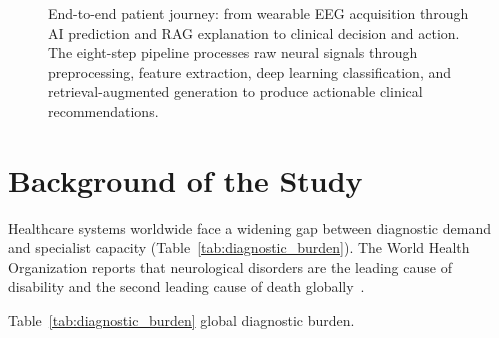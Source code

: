 \begin{figure}[!htbp]
{%
}
\caption[End-to-end patient journey]{End-to-end patient journey: from wearable EEG acquisition through AI prediction and RAG explanation to clinical decision and action. The eight-step pipeline processes raw neural signals through preprocessing, feature extraction, deep learning classification, and retrieval-augmented generation to produce actionable clinical recommendations.}
\label{fig:patient_journey}
\end{figure}

\section{Background of the Study}
\label{sec:background}

Healthcare systems worldwide face a widening gap between diagnostic demand and specialist capacity (Table~\ref{tab:diagnostic_burden}). The World Health Organization reports that neurological disorders are the leading cause of disability and the second leading cause of death globally~\cite{who2024neuro}.


\label{tab:diagnostic_burden}
\label{tab:non_claims}
\label{tab:study_scope}
\label{fig:unified_framework}
\label{tab:boundary_conditions}
\iffalse %
\noindent Table~\ref{tab:diagnostic_burden} global diagnostic burden.

